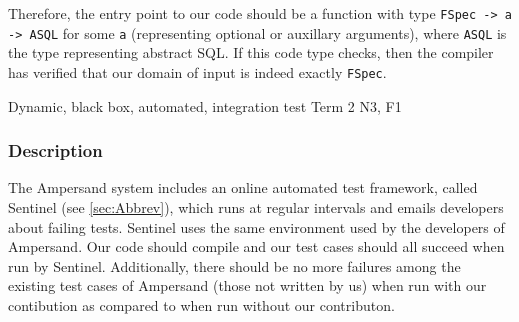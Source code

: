 \documentclass[12pt]{report}
\begin{document}
Therefore, the entry point to our code should be a function with type
\verb|FSpec -> a -> ASQL| for some \verb|a| (representing optional or auxillary
arguments), where \verb|ASQL| is the type representing abstract SQL. If this
code type checks, then the compiler has verified that our domain of input is
indeed exactly \verb|FSpec|.


{Dynamic, black box, automated, integration test}
{Term 2}
{N3, F1}
\vspace{-12pt}\subsubsection*{Description}

The Ampersand system includes an online automated test framework, called
Sentinel (see \ref{sec:Abbrev}), which runs at regular intervals and emails
developers about failing tests. Sentinel uses the same environment used by the
developers of Ampersand. Our code should compile and our test cases should all
succeed when run by Sentinel. Additionally, there should be no more failures
among the existing test cases of Ampersand (those not written by us) when run
with our contibution as compared to when run without our contributon. 
		
		

\end{document}

